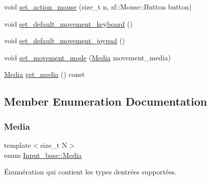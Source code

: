 \begin{DoxyCompactItemize}
\item 
void \mbox{\hyperlink{class_input__base_aa5600e81056832d37167aec2ff0034a4}{set\+\_\+action\+\_\+mouse}} (size\+\_\+t n, sf\+::\+Mouse\+::\+Button button)
\item 
void \mbox{\hyperlink{class_input__base_ae4092ec083ca10480a0fd61301b336f1}{set\+\_\+default\+\_\+movement\+\_\+keyboard}} ()
\item 
void \mbox{\hyperlink{class_input__base_a50d1a01cf671110d8b73c7b48b18095f}{set\+\_\+default\+\_\+movement\+\_\+joypad}} ()
\item 
void \mbox{\hyperlink{class_input__base_a103633f42d3fa58352a12b54ed4b3faf}{set\+\_\+movement\+\_\+mode}} (\mbox{\hyperlink{class_input__base_a455585e7933485981b3d7bfcad3a47c6}{Media}} movement\+\_\+media)
\item 
\mbox{\hyperlink{class_input__base_a455585e7933485981b3d7bfcad3a47c6}{Media}} \mbox{\hyperlink{class_input__base_a4401384d72363249b975aa2611164f39}{get\+\_\+media}} () const
\end{DoxyCompactItemize}


\subsection{Member Enumeration Documentation}
\mbox{\label{class_input__base_a455585e7933485981b3d7bfcad3a47c6}} 
\subsubsection{\texorpdfstring{Media}{Media}}
{\footnotesize\ttfamily template$<$size\+\_\+t N$>$ \\
enum \mbox{\hyperlink{class_input__base_a455585e7933485981b3d7bfcad3a47c6}{Input\+\_\+base\+::\+Media}}\hspace{0.3cm}{\ttfamily [strong]}}



Énumération qui contient les types d\textquotesingle{}entrées supportées. 

